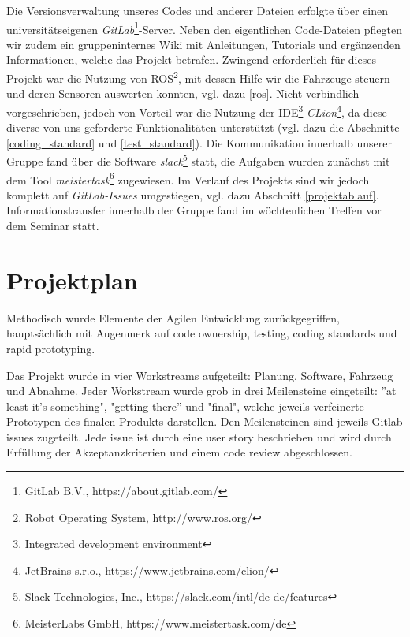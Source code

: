 \documentclass[a4paper, 12pt, titlepage]{scrartcl}
\begin{document}
		Die Versionsverwaltung unseres Codes und anderer Dateien erfolgte über einen universitätseigenen \emph{GitLab}\footnote{GitLab B.V., https://about.gitlab.com/}-Server. Neben den eigentlichen Code-Dateien pflegten wir zudem ein gruppeninternes
		Wiki mit Anleitungen, Tutorials und ergänzenden Informationen, welche das Projekt betrafen.
		Zwingend erforderlich für dieses Projekt war die Nutzung von ROS\footnote{Robot Operating System, http://www.ros.org/},
		mit dessen Hilfe wir die Fahrzeuge steuern und deren Sensoren auswerten konnten, vgl. dazu \ref{ros}.
		Nicht verbindlich vorgeschrieben, jedoch von Vorteil war die Nutzung der IDE\footnote{Integrated development environment}
		\emph{CLion}\footnote{JetBrains s.r.o., https://www.jetbrains.com/clion/}, da diese diverse von uns geforderte Funktionalitäten unterstützt (vgl. dazu die Abschnitte \ref{coding_standard} und \ref{test_standard}).
		Die Kommunikation innerhalb unserer Gruppe fand über die Software \emph{slack}\footnote{Slack Technologies, Inc., https://slack.com/intl/de-de/features} statt, die Aufgaben wurden zunächst mit dem Tool \emph{meistertask}\footnote{MeisterLabs GmbH, https://www.meistertask.com/de} zugewiesen. Im Verlauf des Projekts sind wir jedoch komplett auf \emph{GitLab-Issues} umgestiegen, vgl. dazu Abschnitt \ref{projektablauf}. Informationstransfer innerhalb der Gruppe fand im wöchtenlichen Treffen vor dem Seminar statt.

	\section{Projektplan}
	\label{projektplan}

	Methodisch wurde Elemente der Agilen Entwicklung zurückgegriffen, hauptsächlich mit Augenmerk auf code ownership, testing, coding standards und rapid prototyping.

	Das Projekt wurde in vier Workstreams aufgeteilt: Planung, Software, Fahrzeug und Abnahme. Jeder Workstream wurde grob in drei Meilensteine eingeteilt: ''at least it's something", "getting there'' und "final", welche jeweils verfeinerte Prototypen des finalen Produkts darstellen. Den Meilensteinen sind jeweils Gitlab issues zugeteilt. Jede issue ist durch eine user story beschrieben und wird durch Erfüllung der Akzeptanzkriterien und einem code review abgeschlossen.
\end{document}
